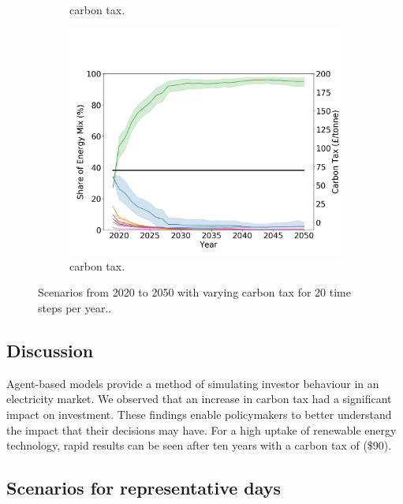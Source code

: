 \begin{figure}[h]
\begin{subfigure}[b]{0.6\textwidth}
		\caption[]%
		{ carbon tax.}
		\label{fig:demand99carbon20}
	\end{subfigure}
	\begin{subfigure}[b]{0.6\textwidth}
		\centering
		\includegraphics[width=\textwidth]{Chapter4/figures/scenarios/demand099-carbon70-datetime.png}
		\caption[Network2]%
		{\small {} carbon tax.}
		\label{fig:demand99carbon70}
	\end{subfigure}
	\caption{Scenarios from 2020 to 2050 with varying carbon tax for 20 time steps per year..}
\end{figure}









\subsection{Discussion}


Agent-based models provide a method of simulating investor behaviour in an electricity market. We observed that an increase in carbon tax had a significant impact on investment. These findings enable policymakers to better understand the impact that their decisions may have. For a high uptake of renewable energy technology, rapid results can be seen after ten years with a carbon tax of  (\$90).




\subsection{Scenarios for representative days}
\label{elecsim:sec:representative-days-scenarios}

